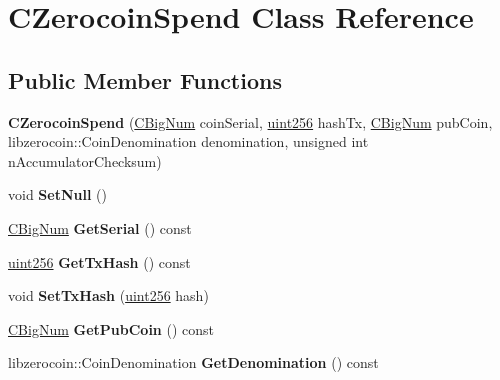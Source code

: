 \hypertarget{class_c_zerocoin_spend}{}\section{C\+Zerocoin\+Spend Class Reference}
\label{class_c_zerocoin_spend}
\subsection*{Public Member Functions}
\begin{DoxyCompactItemize}
\item 
\mbox{\label{class_c_zerocoin_spend_a49ebc73ff44c8f083f2a0a6167b398ca}} 
{\bfseries C\+Zerocoin\+Spend} (\mbox{\hyperlink{class_c_big_num}{C\+Big\+Num}} coin\+Serial, \mbox{\hyperlink{classuint256}{uint256}} hash\+Tx, \mbox{\hyperlink{class_c_big_num}{C\+Big\+Num}} pub\+Coin, libzerocoin\+::\+Coin\+Denomination denomination, unsigned int n\+Accumulator\+Checksum)
\item 
\mbox{\label{class_c_zerocoin_spend_a53564d910f577b8fc8b3635f4a1d3519}} 
void {\bfseries Set\+Null} ()
\item 
\mbox{\label{class_c_zerocoin_spend_a83d8992bc0afa66cc69826b53944e09a}} 
\mbox{\hyperlink{class_c_big_num}{C\+Big\+Num}} {\bfseries Get\+Serial} () const
\item 
\mbox{\label{class_c_zerocoin_spend_a6a5c4ec5ea75f9219168a9a8739444a5}} 
\mbox{\hyperlink{classuint256}{uint256}} {\bfseries Get\+Tx\+Hash} () const
\item 
\mbox{\label{class_c_zerocoin_spend_a3f24cf49d1340f1475643c0efce7115d}} 
void {\bfseries Set\+Tx\+Hash} (\mbox{\hyperlink{classuint256}{uint256}} hash)
\item 
\mbox{\label{class_c_zerocoin_spend_a9f77404d5cc19f89ae8d7f85eac11cd3}} 
\mbox{\hyperlink{class_c_big_num}{C\+Big\+Num}} {\bfseries Get\+Pub\+Coin} () const
\item 
\mbox{\label{class_c_zerocoin_spend_a1dedf40ef176104a0e4714d3b7c392c2}} 
libzerocoin\+::\+Coin\+Denomination {\bfseries Get\+Denomination} () const

\end{DoxyCompactItemize}
